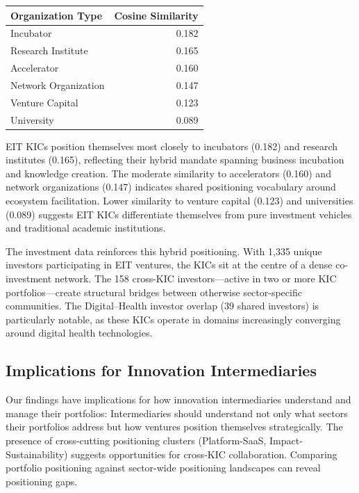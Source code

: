 \documentclass[../main.tex]{subfiles}
\begin{document}
\begin{center}
\small
\begin{tabular}{lr}
\toprule
\textbf{Organization Type} & \textbf{Cosine Similarity} \\
\midrule
Incubator & 0.182 \\
Research Institute & 0.165 \\
Accelerator & 0.160 \\
Network Organization & 0.147 \\
Venture Capital & 0.123 \\
University & 0.089 \\
\bottomrule
\end{tabular}
\end{center}

EIT KICs position themselves most closely to incubators (0.182) and research institutes (0.165), reflecting their hybrid mandate spanning business incubation and knowledge creation. The moderate similarity to accelerators (0.160) and network organizations (0.147) indicates shared positioning vocabulary around ecosystem facilitation. Lower similarity to venture capital (0.123) and universities (0.089) suggests EIT KICs differentiate themselves from pure investment vehicles and traditional academic institutions.

The investment data reinforces this hybrid positioning. With 1,335 unique
investors participating in EIT ventures, the KICs sit at the centre of a
dense co-investment network. The 158 cross-KIC investors---active in two
or more KIC portfolios---create structural bridges between otherwise
sector-specific communities. The Digital--Health investor overlap (39 shared investors) is
particularly notable, as these KICs operate in domains increasingly
converging around digital health technologies.

\subsection{Implications for Innovation Intermediaries}

Our findings have implications for how innovation intermediaries understand and manage their portfolios: Intermediaries should understand not only what sectors their portfolios address but how ventures position themselves strategically. The presence of cross-cutting positioning clusters (Platform-SaaS, Impact-Sustainability) suggests opportunities for cross-KIC collaboration. Comparing portfolio positioning against sector-wide positioning landscapes can reveal positioning gaps.
\end{document}
